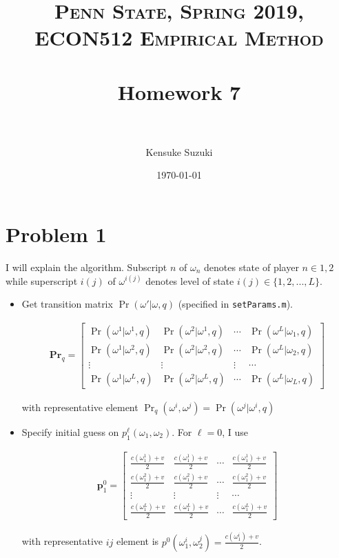 \documentclass[11pt,letter]{article}
\title{	
\normalfont \normalsize 
\textsc{Penn State, Spring 2019, ECON512 Empirical Method} \\ [25pt] %
\horrule{0.5pt} \\[0.2cm] %
\huge Homework 7 \\ %
\horrule{2pt} \\[0.2cm] %
}
\author{Kensuke Suzuki} %
\date{\normalsize\today} %
\newcommand{\vect}[1]{\boldsymbol{\mathbf{#1}}}
\newcounter{lem}[section] \setcounter{lem}{0}
\newcounter{notes}[section] \setcounter{notes}{0}
\newcommand{\mprn}[1]{\{{#1}\}}
\newcommand{\bmat}[1]{\begin{bmatrix} #1 \end{bmatrix}}%
\newcommand{\code}[1]{\texttt{#1}}
\begin{document}
\maketitle %


\section*{Problem 1}

I will explain the algorithm. Subscript $n$ of  $\omega_n$ denotes state of player $n\in{1,2}$ while superscript $i(j)$ of $\omega^{i(j)}$ denotes level of state $i(j)\in\mprn{1,2,...,L}$. 

\begin{itemize}

\item Get transition matrix $\Pr(\omega'|\omega,q)$ (specified in \code{setParams.m}).


\begin{align*}
\vect{Pr}_q = \bmat{\Pr(\omega^1|\omega^1,q) & \Pr(\omega^2|\omega^1,q) & \cdots & \Pr(\omega^L|\omega_1,q)\\
						\Pr(\omega^1|\omega^2,q) & \Pr(\omega^2|\omega^2,q) & \cdots & \Pr(\omega^L|\omega_2,q) \\
						\vdots & \vdots & \vdots & \cdots \\
						\Pr(\omega^1|\omega^L,q) & \Pr(\omega^2|\omega^L,q) & \cdots & \Pr(\omega^L|\omega_L,q)}
\end{align*}

with representative element $\Pr_q(\omega^i,\omega^j)=\Pr(\omega^j|\omega^i,q)$

\item Specify initial guess on $p_1^\ell(\omega_1,\omega_2)$. For $\ell=0$, I use

\begin{align*}
\vect{p}_1^0 = \bmat{\frac{c(\omega_1^1) + v}{2} & \frac{c(\omega_1^1) + v}{2} & \cdots & \frac{c(\omega_1^1) + v}{2}\\
						\frac{c(\omega_1^2) + v}{2} & \frac{c(\omega_1^2) + v}{2} & \cdots & \frac{c(\omega_1^2) + v}{2} \\
						\vdots & \vdots & \vdots & \cdots \\
						\frac{c(\omega_1^L) + v}{2} & \frac{c(\omega_1^L) + v}{2} & \cdots & \frac{c(\omega_1^L) + v}{2}}
\end{align*}

with representative $ij$ element is $p^0(\omega_1^i,\omega_2^j) = \frac{c(\omega_1^i)+v}{2}$.


\end{itemize}
\end{document}
